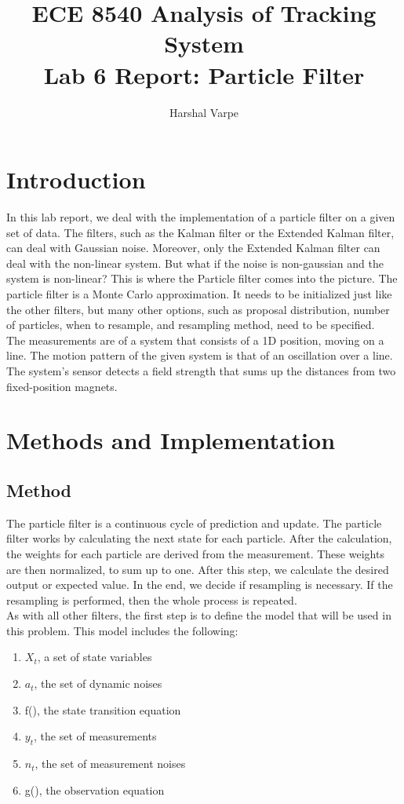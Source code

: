 \documentclass{article}
\author{ Harshal Varpe}
\title{ECE 8540 Analysis of Tracking System\\
\Large Lab 6 Report: Particle Filter }
\begin{document}
\maketitle

\section{Introduction}\label{sec:intro}

In this lab report, we deal with the implementation of a particle filter on a given set of data. The filters, such as the Kalman filter or the Extended Kalman filter, can deal with Gaussian noise. Moreover, only the Extended Kalman filter can deal with the non-linear system. But what if the noise is non-gaussian and the system is non-linear? This is where the Particle filter comes into the picture. The particle filter is a Monte Carlo approximation. It needs to be initialized just like the other filters, but many other options, such as proposal distribution, number of particles, when to resample, and resampling method, need to be specified.\\

The measurements are of a system that consists of a 1D position, moving on a line. The motion pattern of the given system is that of an oscillation over a line. The system's sensor detects a field strength that sums up the distances from two fixed-position magnets.

\section{Methods and Implementation}\label{sec:meth}
\subsection{Method}\label{subsec:1}
The particle filter is a continuous cycle of prediction and update. The particle filter works by calculating the next state for each particle. After the calculation, the weights for each particle are derived from the measurement. These weights are then normalized, to sum up to one. After this step, we calculate the desired output or expected value. In the end, we decide if resampling is necessary. If the resampling is performed, then the whole process is repeated.\\

As with all other filters, the first step is to define the model that will be used in this problem. This model includes the following: 
\begin{enumerate}
\item $X_t$, a set of state variables
\item $a_t$, the set of dynamic noises
\item f(), the state transition equation
\item $y_t$, the set of measurements
\item $n_t$, the set of measurement noises
\item g(), the observation equation\\
\end{enumerate}
\end{document}
